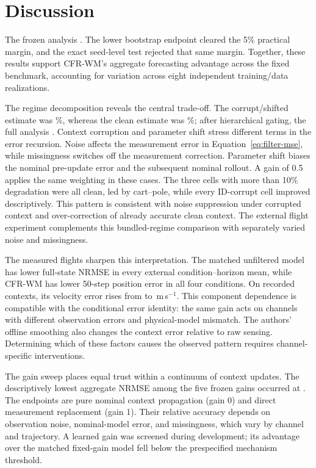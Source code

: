 \section{Discussion}

The frozen analysis \PrimaryInterpretation. The lower bootstrap endpoint
cleared the 5\% practical margin, and the exact seed-level test rejected that
same margin. Together, these results support CFR-WM's aggregate forecasting
advantage across the fixed benchmark, accounting for variation
across eight independent training/data realizations.

The regime decomposition reveals the central trade-off. The
corrupt/shifted estimate was \CorruptImprovement\%, whereas the clean estimate
was \CleanImprovement\%; after hierarchical gating, the full analysis
\RobustnessInterpretation. Context corruption and parameter shift stress
different terms in the error recursion. Noise affects the measurement error in
Equation~\eqref{eq:filter-mse}, while missingness switches off the measurement
correction. Parameter shift biases
the nominal pre-update error and the subsequent nominal rollout. A gain of 0.5
applies the same weighting in these cases. The three cells with more than 10\%
degradation were all clean, led by cart--pole, while every ID-corrupt cell improved
descriptively. This pattern is consistent with noise suppression under
corrupted context and over-correction of already accurate clean context.
The external flight experiment complements this bundled-regime comparison
with separately varied noise and missingness.

The measured flights sharpen this interpretation. The matched unfiltered
model has lower full-state NRMSE in every external condition--horizon mean,
while CFR-WM has lower 50-step position error in all four conditions.
On recorded contexts, its velocity error rises from
\ExternalUnfilteredRecordedLongVelocityMean{} to
\ExternalCFRRecordedLongVelocityMean{}\,m\,s$^{-1}$.
This component dependence is compatible with the conditional error identity:
the same gain acts on channels with different observation errors and
physical-model mismatch. The authors' offline smoothing also changes the
context error relative to raw sensing. Determining which of these factors
causes the observed pattern requires channel-specific interventions.

The gain sweep places equal trust within a continuum of context updates. The
descriptively lowest aggregate NRMSE among the five frozen gains occurred at
\BestGain. The endpoints are pure nominal context propagation (gain 0) and
direct measurement replacement (gain 1). Their relative accuracy depends on
observation noise, nominal-model error, and missingness, which vary by channel
and trajectory. A learned gain was screened during development; its advantage
over the matched fixed-gain model fell below the prespecified mechanism
threshold.

